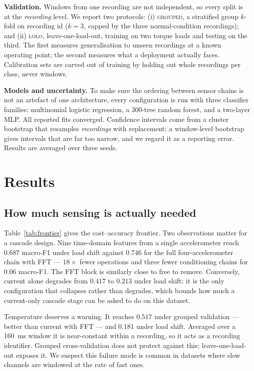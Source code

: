 \documentclass[conference,10pt]{IEEEtran}          %
\begin{document}
\textbf{Validation.} Windows from one recording are not independent, so
every split is at the \emph{recording} level. We report two protocols:
(i) \textsc{grouped}, a stratified group $k$-fold on recording id
($k=3$, capped by the three normal-condition recordings); and
(ii) \textsc{lolo}, leave-one-load-out, training on two torque loads and
testing on the third. The first measures generalisation to unseen
recordings at a known operating point; the second measures what a
deployment actually faces. Calibration sets are carved out of training by
holding out whole recordings per class, never windows.

\textbf{Models and uncertainty.} To make sure the ordering between sensor
chains is not an artefact of one architecture, every configuration is run
with three classifier families: multinomial logistic regression, a
300-tree random forest, and a two-layer MLP. All reported fits converged.
Confidence intervals come from a cluster bootstrap that resamples
\emph{recordings} with replacement; a window-level bootstrap gives
intervals that are far too narrow, and we regard it as a reporting error.
Results are averaged over three seeds.

\section{Results}



\subsection{How much sensing is actually needed}
Table~\ref{tab:frontier} gives the cost--accuracy frontier. Two
observations matter for a cascade design. Nine time-domain features from a
single accelerometer reach $0.687$ macro-F1 under load shift against
$0.746$ for the full four-accelerometer chain with FFT --- $18\times$
fewer operations and three fewer conditioning chains for $0.06$ macro-F1.
The FFT block is similarly close to free to remove. Conversely, current
alone degrades from $0.417$ to $0.213$ under load shift: it is the only
configuration that collapses rather than degrades, which bounds how much a
current-only cascade stage can be asked to do on this dataset.

Temperature deserves a warning. It reaches $0.517$ under grouped
validation --- better than current with FFT --- and $0.181$ under load
shift. Averaged over a \SI{160}{\milli\second} window it is near-constant
within a recording, so it acts as a recording identifier. Grouped
cross-validation does not protect against this; leave-one-load-out exposes
it. We suspect this failure mode is common in datasets where slow channels
are windowed at the rate of fast ones.
\end{document}
